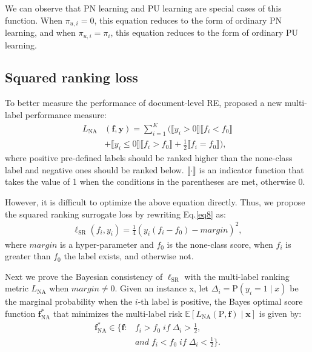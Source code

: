 \documentclass[11pt]{article}
\begin{document}
We can observe that PN learning and PU learning are special cases of this function. When $\pi_{u,i}=0$, this equation reduces to the form of ordinary PN learning, and when $\pi_{u,i}=\pi_{i}$, this equation reduces to the form of ordinary PU learning.

\subsection{Squared ranking loss}

To better measure the performance of document-level RE, \citep{ijcai2022p630} proposed a new multi-label performance measure:
\begin{equation}
\begin{aligned}\label{eq14}
L_{\mathrm{NA}}&(\boldsymbol{f}, \boldsymbol{y})= \sum_{i=1}^{K}(\llbracket y_{i}>0 \rrbracket \llbracket f_{i}<f_{0} \rrbracket\\
&+\llbracket y_{i} \leq 0 \rrbracket \llbracket f_{i}>f_{0} \rrbracket+\frac{1}{2} \llbracket f_{i}=f_{0} \rrbracket),
\end{aligned}
\end{equation}
where positive pre-defined labels should be ranked higher than the none-class label and negative ones should be ranked below. $\llbracket \cdot \rrbracket$ is an indicator function that takes the value of 1 when the conditions in the parentheses are met, otherwise 0.

However, it is difficult to optimize the above equation directly. Thus, we propose the squared ranking surrogate loss by rewriting Eq.\ref{eq8} as:
\begin{equation}
\begin{aligned}\label{eq15}
\ell_{\mathrm{SR}}(f_{i}, y_{i})=
\frac{1}{4}(y_{i}(f_{i}-f_{0})-margin)^{2},
\end{aligned}
\end{equation}
where $margin$ is a hyper-parameter and $f_{0}$ is the none-class score, when $f_{i}$ is greater than $f_{0}$ the label exists, and otherwise not.

Next we prove the Bayesian consistency of $\ell_{\mathrm{SR}}$ with the multi-label ranking metric $L_{\mathrm{NA}}$ when $margin \neq 0$. Given an instance x, let $\Delta_{i} = \mathrm{P}(y_{i}=1 \mid x)$ be the marginal probability when the $i$-th label is positive, the Bayes optimal score function $\boldsymbol{f}_{\mathrm{NA}}^{*}$ that minimizes the multi-label risk $\mathbb{E}[L_{\mathrm{NA}}(\mathrm{P}, \boldsymbol{f}) \mid \boldsymbol{x}]$ is given by:
\begin{equation}
\begin{aligned}\label{eq16}
\boldsymbol{f}_{\mathrm{NA}}^{*} \in \{\boldsymbol{f} : &f_{i}>f_{0} \; if \; \Delta_{i}>\frac{1}{2}, \\&and \; f_{i}<f_{0} \; if \; \Delta_{i}<\frac{1}{2}\}.
\end{aligned}
\end{equation}
\end{document}
